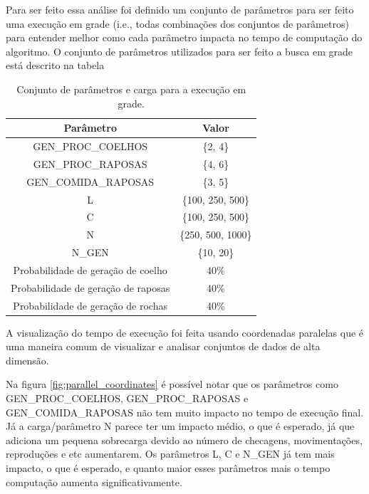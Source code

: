 \documentclass{article}
\begin{document}
Para ser feito essa análise foi definido um conjunto de parâmetros para ser feito uma execução em grade (i.e., todas combinações dos conjuntos de parâmetros) para entender melhor como cada parâmetro impacta no tempo de computação do algoritmo. O conjunto de parâmetros utilizados para ser feito a busca em grade está descrito na tabela

\begin{table}[H]
	\begin{center}
		\begin{tabular}{|c|c|}
			\hline
			Parâmetro                           & Valor              \\
			\hline
			GEN\_PROC\_COELHOS                  & \{2, 4\}           \\
			GEN\_PROC\_RAPOSAS                  & \{4, 6\}           \\
			GEN\_COMIDA\_RAPOSAS                & \{3, 5\}            \\
			L                                   & \{100, 250, 500\}  \\
			C                                   & \{100, 250, 500\}  \\
			N                                   & \{250, 500, 1000\} \\
			N\_GEN                              & \{10, 20\}         \\\hline
			Probabilidade de geração de coelho  & 40\%               \\
			Probabilidade de geração de raposas & 40\%               \\
			Probabilidade de geração de rochas  & 40\%               \\
			\hline
		\end{tabular}
	\end{center}
	\caption{Conjunto de parâmetros e carga para a execução em grade.}
\end{table}

A visualização do tempo de execução foi feita usando coordenadas paralelas que é uma maneira comum de visualizar e analisar conjuntos de dados de alta dimensão.





Na figura \ref{fig:parallel_coordinates} é possível notar que os parâmetros como 
GEN\_PROC\_COELHOS,
GEN\_PROC\_RAPOSAS e  
GEN\_COMIDA\_RAPOSAS não tem muito impacto no tempo de execução final. Já a carga/parâmetro N parece ter um impacto médio, o que é esperado, já que adiciona um pequena sobrecarga devido ao número de checagens, movimentações, reproduções e etc aumentarem. Os parâmetros L, C e N\_GEN já tem mais impacto, o que é esperado, e quanto maior esses parâmetros mais o tempo computação aumenta significativamente.
\end{document}

